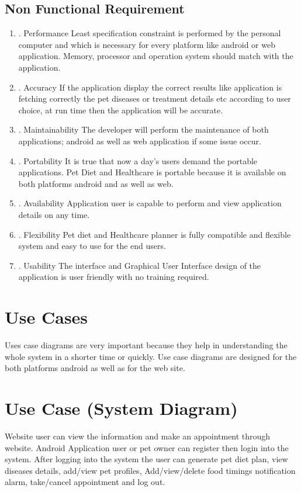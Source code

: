 \subsection{Non Functional Requirement}
\begin{enumerate}[label=\alph*]
\item.	Performance
Least specification constraint is performed by the personal computer and which is necessary for every platform like android or web application. Memory, processor and operation system should match with the application.
\item.	Accuracy
If the application display the correct results like application is fetching correctly the pet diseases or treatment details etc according to user choice,  at run time then the application will be accurate.
\item.	Maintainability
The developer will perform the maintenance of both applications; android as well as web application if some issue occur.
\item.	Portability
It is true that now a day’s users demand the portable applications. Pet Diet and Healthcare is portable because it is available on both platforms android and as well as web.
\item.	Availability	
Application user is capable to perform and view application details on any time.
\item.	Flexibility
Pet diet and Healthcare planner is fully compatible and flexible system and easy to use for the end users.
\item.	Usability
The interface and Graphical User Interface design of the application is user friendly with no training required.
\end{enumerate}
\newpage
\section{Use Cases}
Uses case diagrams are very important because they help in understanding the whole system in a shorter time or quickly. Use case diagrams are designed for the both platforms android as well as for the web site.
\section{Use Case (System Diagram)}
Website user can view the information and make an appointment through website. 
Android Application user or pet owner can register then login into the system. After logging into the system the user can generate pet diet plan, view diseases details, add/view pet profiles, Add/view/delete food timings notification alarm, take/cancel appointment and log out.

